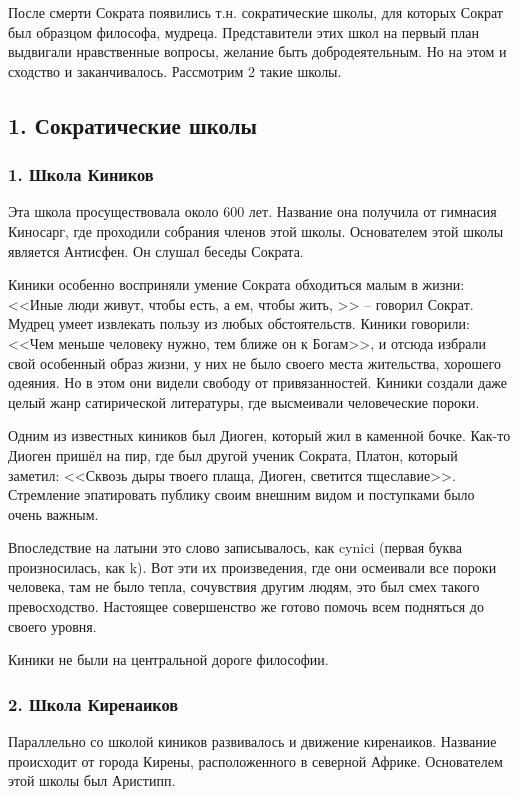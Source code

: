 \documentclass[a4paper, 12pt]{book} %
\begin{document}
После смерти Сократа появились т.н. сократические школы, для которых Сократ был образцом философа, мудреца. Представители этих школ на первый план выдвигали нравственные вопросы, желание быть добродеятельным. Но на этом и сходство и заканчивалось. Рассмотрим 2 такие школы.

\subsection*{1. Сократические школы}
\subsubsection*{1. Школа Киников}
Эта школа просуществовала около 600 лет. Название она получила от гимнасия Киносарг, где проходили собрания членов этой школы. Основателем этой школы является Антисфен. Он слушал беседы Сократа.

Киники особенно восприняли умение Сократа обходиться малым в жизни: <<Иные люди живут, чтобы есть, а ем, чтобы жить, >> -- говорил Сократ. Мудрец умеет извлекать пользу из любых обстоятельств. Киники говорили: <<Чем меньше человеку нужно, тем ближе он к Богам>>, и отсюда избрали свой особенный образ жизни, у них не было своего места жительства, хорошего одеяния. Но в этом они видели свободу от привязанностей. Киники создали даже целый жанр сатирической литературы, где высмеивали человеческие пороки.

Одним из известных киников был Диоген, который жил в каменной бочке. Как-то Диоген пришёл на пир, где был другой ученик Сократа, Платон, который заметил: <<Сквозь дыры твоего плаща, Диоген, светится тщеславие>>. Стремление эпатировать публику своим внешним видом и поступками было очень важным. 

Впоследствие на латыни это слово записывалось, как cynici (первая буква произносилась, как k). Вот эти их произведения, где они осмеивали все пороки человека, там не было тепла, сочувствия другим людям, это был смех такого превосходство. Настоящее совершенство же готово помочь всем подняться до своего уровня.

Киники не были на центральной дороге философии. 

\subsubsection*{2. Школа Киренаиков}
Параллельно со школой киников развивалось и движение киренаиков. Название происходит от города Кирены, расположенного в северной Африке. Основателем этой школы был Аристипп. 
\end{document}
